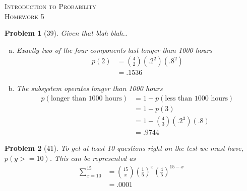 \documentclass{article}
\theoremstyle{problem}
\newtheorem{prob}{Problem}
\begin{document}
\begin{center}
  \textsc{\Large Introduction to Probability}\\[.3cm]
  \textsc{\Large Homework 5}
\end{center}

\begin{prob}[39]
  Given that blah blah..
  \begin{enumerate}[a)]
  \item Exactly two of the four components last longer than 1000 hours
    \begin{align*}
      p(2) &= {4 \choose 2} (.2^2) (.8^2)\\
      &= .1536
    \end{align*}
  \item The subsystem operates longer than 1000 hours
    \begin{align*}
      p(\text{longer than 1000 hours}) &= 1 - p(\text{less than 1000 hours})\\
      &= 1 - p(3)\\
      &= 1 - {4 \choose 3} (.2^3) (.8)\\
      &= .9744
    \end{align*}
  \end{enumerate}
\end{prob}
%
\begin{prob}[41]
To get at least 10 questions right on the test we must have, $p(y >= 10)$. This can be represented as
\begin{align*}
\displaystyle \sum_{x = 10}^{15} &= {15 \choose x} \left(\frac{1}{5}\right)^x \left(\frac{4}{5}\right)^{15-x}\\
&= .0001
\end{align*}

\end{prob}
%
\end{document}

